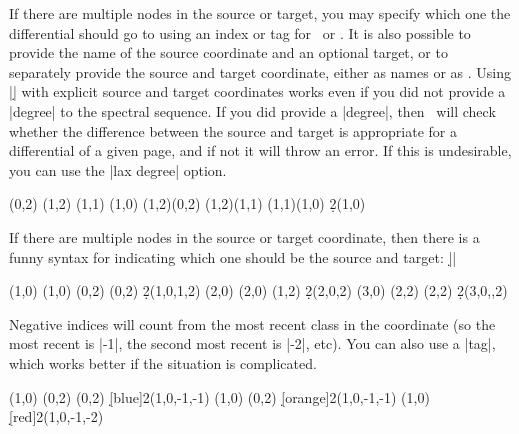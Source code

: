 \begin{sseqdata}[name = basic, cohomological Serre grading]
\begin{commandlist}
If there are multiple nodes in the source or target, you may specify which one the differential should go to using an index or tag for \sourcen\  or \targetn. It is also possible to provide the name of the source coordinate and an optional target, or to separately provide the source and target coordinate, either as names or as . Using |\d| with explicit source and target coordinates works even if you did not provide a |degree| to the spectral sequence. If you did provide a |degree|, then \sseqpages\  will check whether the difference between the source and target is appropriate for a differential of a given page, and if not it will throw an error. If this is undesirable, you can use the |lax degree| option.
\begin{codeexample}[width = 7.5cm]
\begin{sseqdata}[ name = d example, degree = {-1}{#1},
                  struct lines = blue, yscale = 1.3 ]
\class(0,2)
\class(1,2)
\class(1,1)
\class(1,0)
\structline(1,2)(0,2)
\structline(1,2)(1,1)
\structline(1,1)(1,0)
\d2(1,0)
\end{sseqdata}
\printpage[ name = d example, page = 2 ] \quad
\printpage[ name = d example, page = 3 ]
\end{codeexample}
If there are multiple nodes in the source or target coordinate, then there is a funny syntax for indicating which one should be the source and target:
|\d{}|
\begin{codeexample}[width = 7.5cm]
\begin{sseqpage}[ Adams grading, yscale = 0.8 ]
\class(1,0) \class(1,0)
\class(0,2) \class(0,2)
\d2(1,0,1,2)
\class(2,0) \class(2,0)
\class(1,2)
\d2(2,0,2)
\class(3,0)
\class(2,2) \class(2,2)
\d2(3,0,,2)
\end{sseqpage}
\end{codeexample}
Negative indices will count from the most recent class in the coordinate (so the most recent is |-1|, the second most recent is |-2|, etc). You can also use a |tag|, which works better if the situation is complicated.
\begin{codeexample}[width = 7.5cm]
\begin{sseqpage}[ Adams grading, yscale = 0.65 ]
\class(1,0)
\class(0,2) \class(0,2)
\d[blue]2(1,0,-1,-1)
\class(1,0)
\class(0,2)
\d[orange]2(1,0,-1,-1)
\class(1,0)
\d[red]2(1,0,-1,-2)
\end{sseqpage}
\end{codeexample}
\end{commandlist}


\end{sseqdata}
